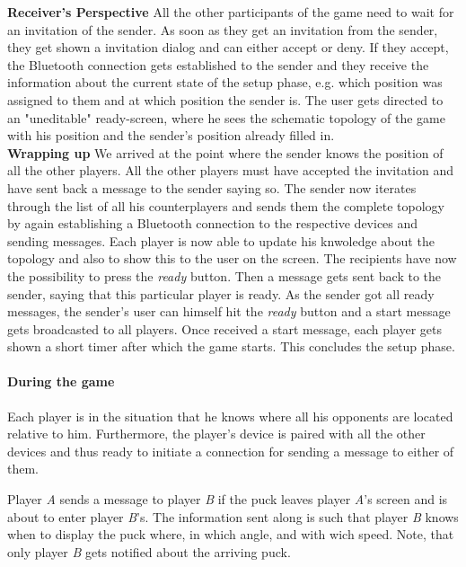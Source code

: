 \documentclass{report}
\begin{document}
\textbf{Receiver's Perspective} All the other participants of the game need to wait for an invitation of the sender. As soon as they get an invitation from the sender, they get shown a invitation dialog and can either accept or deny. If they accept, the Bluetooth connection gets established to the sender and they receive the information about the current state of the setup phase, e.g. which position was assigned to them and at which position the sender is. The user gets directed to an "uneditable" ready-screen, where he sees the schematic topology of the game with his position and the sender's position already filled in.\\

\textbf{Wrapping up} We arrived at the point where the sender knows the position of all the other players. All the other players must have accepted the invitation and have sent back a message to the sender saying so. The sender now iterates through  the list of all his counterplayers and sends them the complete topology by again establishing a Bluetooth connection to the respective devices and sending messages. Each player is now able to update his knwoledge about the topology and also to show this to the user on the screen. The recipients have now the possibility to press the \textit{ready} button. Then a message gets sent back to the sender, saying that this particular player is ready. As the sender got all ready messages, the sender's user can himself hit the \textit{ready} button and a start message gets broadcasted to all players. Once received a start message, each player gets shown a short timer after which the game starts. This concludes the setup phase.

\paragraph{During the game} Each player is in the situation that he knows where all his opponents are located relative to him. Furthermore, the player's device is paired with all the other devices and thus ready to initiate a connection for sending a message to either of them.

Player \textit{A} sends a message to player \textit{B} if the puck leaves player \textit{A}'s screen and is about to enter player \textit{B}'s. The information sent along is such that player \textit{B} knows when to display the puck where, in which angle, and with wich speed. Note, that only player \textit{B} gets notified about the arriving puck.
\end{document}
